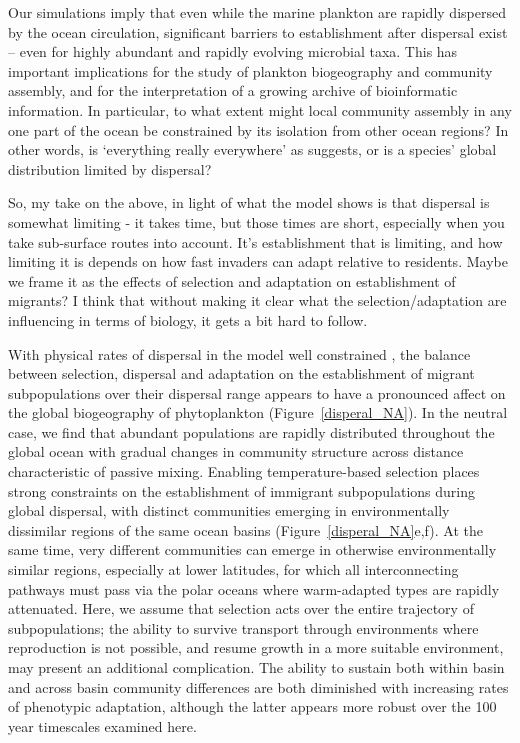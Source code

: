 \documentclass[12pt]{article}
\newcommand{\sinead}[1]{{\color{green} #1}}
\begin{document}
Our simulations imply that even while the marine plankton are rapidly dispersed by the ocean circulation, significant barriers to \sinead{establishment after} dispersal exist -- even for highly abundant and rapidly evolving microbial taxa. This has important implications for the study of plankton biogeography and community assembly, and for the interpretation of a growing archive of bioinformatic information. In particular, to what extent might local community assembly in any one part of the ocean be constrained by its isolation from other ocean regions? In other words, is `everything really everywhere' as \citet{BaasBecking:1934} suggests, or is a species' global distribution limited by dispersal?

\sinead{So, my take on the above, in light of what the model shows is that dispersal is somewhat limiting - it takes time, but those times are short, especially when you take sub-surface routes into account. It's establishment that is limiting, and how limiting it is depends on how fast invaders can adapt relative to residents. Maybe we frame it as the effects of selection and adaptation on establishment of migrants? I think that without making it clear what the selection/adaptation are influencing in terms of biology, it gets a bit hard to follow.}

With physical rates of dispersal in the model well constrained \citep{Forget:2015}, the balance between selection, dispersal and adaptation \sinead{on the establishment of migrant subpopulations over their dispersal range} appears to have a pronounced affect on the global biogeography of phytoplankton (Figure~\ref{disperal_NA}). In the neutral case, we find that abundant populations are rapidly distributed throughout the global ocean with gradual changes in community structure across distance characteristic of passive mixing. Enabling temperature-based selection places strong constraints on \sinead{the establishment of immigrant subpopulations during} global dispersal, with distinct communities emerging in environmentally dissimilar regions of the same ocean basins (Figure~\ref{disperal_NA}e,f). At the same time, very different communities can emerge in otherwise environmentally similar regions, especially at lower latitudes, for which all interconnecting pathways must pass via the polar oceans where warm-adapted types are rapidly attenuated. \sinead{Here, we assume that selection acts over the entire trajectory of subpopulations; the ability to survive transport through environments where reproduction is not possible, and resume growth in a more suitable environment, may present an additional complication.} The ability to sustain both within basin and across basin community differences are both diminished with increasing rates of phenotypic adaptation, although the latter appears more robust over the 100 year timescales examined here. 
\end{document}
